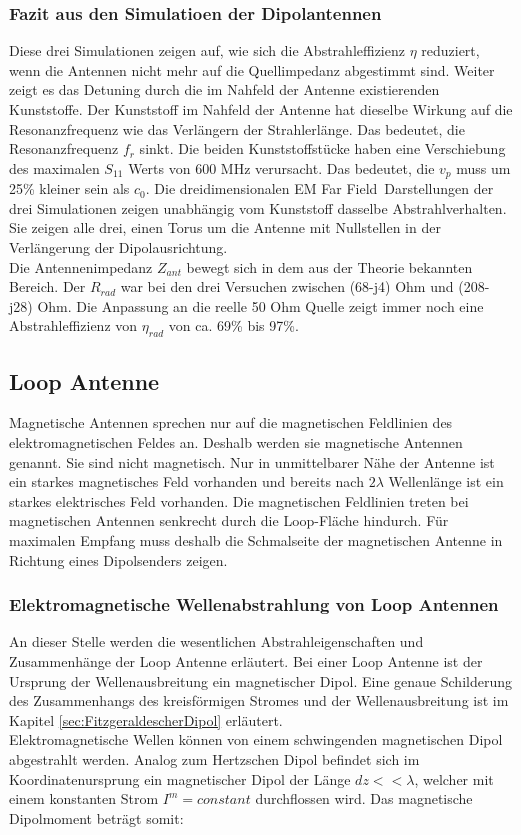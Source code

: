 \subsubsection{Fazit aus den Simulatioen der Dipolantennen}
Diese drei Simulationen zeigen auf, wie sich die Abstrahleffizienz $\eta$ reduziert, wenn die Antennen nicht mehr auf die Quellimpedanz abgestimmt sind. Weiter zeigt es das Detuning durch die im Nahfeld der Antenne existierenden Kunststoffe. Der Kunststoff im Nahfeld der Antenne hat dieselbe Wirkung auf die Resonanzfrequenz wie das Verlängern der  Strahlerlänge. Das bedeutet, die Resonanzfrequenz $f_{r}$ sinkt.  Die beiden Kunststoffstücke haben eine Verschiebung des maximalen $S_{11}$ Werts von 600 MHz verursacht. Das bedeutet, die $v_p$ muss um 25\% kleiner sein als $c_0$.
Die dreidimensionalen \glqq EM Far Field\grqq \  Darstellungen der drei Simulationen zeigen unabhängig vom Kunststoff dasselbe Abstrahlverhalten. Sie zeigen alle drei, einen Torus um die Antenne mit Nullstellen in der Verlängerung der Dipolausrichtung.\\
Die Antennenimpedanz $Z_{ant}$ bewegt sich in dem aus der Theorie bekannten Bereich. Der $R_{rad}$ war bei den drei Versuchen zwischen (68-j4) Ohm und  (208-j28) Ohm. Die Anpassung an die reelle 50 Ohm Quelle zeigt immer noch eine Abstrahleffizienz von $\eta_{rad}$ von   ca. 69\% bis 97\%.



\subsection{Loop Antenne}
Magnetische Antennen sprechen nur auf die magnetischen Feldlinien des elektromagnetischen Feldes an. Deshalb werden sie magnetische Antennen genannt. Sie sind nicht magnetisch. Nur in unmittelbarer Nähe der Antenne ist ein starkes magnetisches Feld vorhanden und bereits nach $2\lambda$ Wellenlänge ist ein starkes elektrisches Feld vorhanden. Die magnetischen Feldlinien treten bei magnetischen Antennen senkrecht durch die Loop-Fläche hindurch. Für maximalen Empfang muss deshalb die Schmalseite der magnetischen Antenne in Richtung eines Dipolsenders  zeigen.

\subsubsection{Elektromagnetische Wellenabstrahlung von Loop Antennen}
An dieser Stelle werden die wesentlichen Abstrahleigenschaften und Zusammenhänge  der Loop Antenne erläutert.
Bei einer Loop Antenne ist der Ursprung der Wellenausbreitung ein magnetischer Dipol. Eine genaue Schilderung des Zusammenhangs des kreisförmigen Stromes und der Wellenausbreitung ist im Kapitel \ref{sec:FitzgeraldescherDipol} erläutert. \\
Elektromagnetische Wellen können  von einem schwingenden magnetischen Dipol
abgestrahlt werden. Analog zum Hertzschen Dipol befindet sich im Koordinatenursprung
ein magnetischer Dipol der Länge $dz<<\lambda$, welcher mit einem konstanten
Strom $I^{m}=constant$ durchflossen wird. Das magnetische Dipolmoment beträgt somit:

